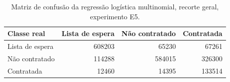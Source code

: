 \begin{table}
\caption{Matriz de confusão da regressão logística multinomial, recorte geral, experimento E5.}
\label{tab:matriz_confusao_logit_ternario_recorte_geral_in_sample_e5}
\begin{tabular}{lrrr}
\toprule
Classe real & Lista de espera & Não contratado & Contratada \\
\midrule
Lista de espera & 608203 & 65230 & 67261 \\
Não contratado & 114288 & 584015 & 326300 \\
Contratada & 12460 & 14395 & 133514 \\
\bottomrule
\end{tabular}
\end{table}
